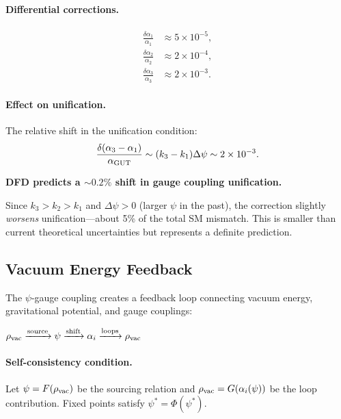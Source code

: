 \paragraph{Differential corrections.}
\begin{align}
\frac{\delta\alpha_1}{\alpha_1} &\approx 5 \times 10^{-5}, \\
\frac{\delta\alpha_2}{\alpha_2} &\approx 2 \times 10^{-4}, \\
\frac{\delta\alpha_3}{\alpha_3} &\approx 2 \times 10^{-3}.
\end{align}

\paragraph{Effect on unification.}
The relative shift in the unification condition:
\begin{equation}
\frac{\delta(\alpha_3 - \alpha_1)}{\alpha_{\rm GUT}} \sim (k_3 - k_1)\Delta\psi \sim 2 \times 10^{-3}.
\end{equation}

\textbf{DFD predicts a $\sim 0.2\%$ shift in gauge coupling unification.}

Since $k_3 > k_2 > k_1$ and $\Delta\psi > 0$ (larger $\psi$ in the past), the correction slightly \textit{worsens} unification---about 5\% of the total SM mismatch. This is smaller than current theoretical uncertainties but represents a definite prediction.

\subsection{Vacuum Energy Feedback}\label{sec:gauge-cc}

The $\psi$-gauge coupling creates a feedback loop connecting vacuum energy, gravitational potential, and gauge couplings:
\begin{center}
$\rho_{\rm vac} \xrightarrow{\text{source}} \psi \xrightarrow{\text{shift}} \alpha_i \xrightarrow{\text{loops}} \rho_{\rm vac}$
\end{center}

\paragraph{Self-consistency condition.}
Let $\psi = F(\rho_{\rm vac})$ be the sourcing relation and $\rho_{\rm vac} = G(\alpha_i(\psi))$ be the loop contribution. Fixed points satisfy $\psi^* = \Phi(\psi^*)$.

